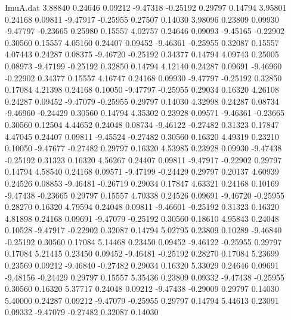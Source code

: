 \begin{filecontents}{ImuA.dat}
   3.88840    0.24646    0.09212   -9.47318   -0.25192    0.29797    0.14794
   3.95801    0.24168    0.09811   -9.47917   -0.25955    0.27507    0.14030
   3.98096    0.23809    0.09930   -9.47797   -0.23665    0.25980    0.15557
   4.02757    0.24646    0.09093   -9.45165   -0.22902    0.30560    0.15557
   4.05160    0.24407    0.09452   -9.46361   -0.25955    0.32087    0.15557
   4.07443    0.24287    0.08375   -9.46720   -0.25192    0.34377    0.14794
   4.09743    0.25005    0.08973   -9.47199   -0.25192    0.32850    0.14794
   4.12140    0.24287    0.09691   -9.46960   -0.22902    0.34377    0.15557
   4.16747    0.24168    0.09930   -9.47797   -0.25192    0.32850    0.17084
   4.21398    0.24168    0.10050   -9.47797   -0.25955    0.29034    0.16320
   4.26108    0.24287    0.09452   -9.47079   -0.25955    0.29797    0.14030
   4.32998    0.24287    0.08734   -9.46960   -0.24429    0.30560    0.14794
   4.35302    0.23928    0.09571   -9.46361   -0.23665    0.30560    0.12504
   4.44652    0.24048    0.08734   -9.46122   -0.27482    0.31323    0.17847
   4.47045    0.24407    0.09811   -9.45524   -0.27482    0.30560    0.16320
   4.49319    0.23210    0.10050   -9.47677   -0.27482    0.29797    0.16320
   4.53985    0.23928    0.09930   -9.47438   -0.25192    0.31323    0.16320
   4.56267    0.24407    0.09811   -9.47917   -0.22902    0.29797    0.14794
   4.58540    0.24168    0.09571   -9.47199   -0.24429    0.29797    0.20137
   4.60939    0.24526    0.08853   -9.46481   -0.26719    0.29034    0.17847
   4.63321    0.24168    0.10169   -9.47438   -0.23665    0.29797    0.15557
   4.70338    0.24526    0.09691   -9.46720   -0.25955    0.28270    0.16320
   4.79594    0.24048    0.09811   -9.46601   -0.25192    0.31323    0.16320
   4.81898    0.24168    0.09691   -9.47079   -0.25192    0.30560    0.18610
   4.95843    0.24048    0.10528   -9.47917   -0.22902    0.32087    0.14794
   5.02795    0.23809    0.10289   -9.46840   -0.25192    0.30560    0.17084
   5.14468    0.23450    0.09452   -9.46122   -0.25955    0.29797    0.17084
   5.21415    0.23450    0.09452   -9.46481   -0.25192    0.28270    0.17084
   5.23699    0.23569    0.09212   -9.46840   -0.27482    0.29034    0.16320
   5.33029    0.24646    0.09691   -9.48156   -0.24429    0.29797    0.15557
   5.35436    0.23809    0.09332   -9.47438   -0.25955    0.30560    0.16320
   5.37717    0.24048    0.09212   -9.47438   -0.29009    0.29797    0.14030
   5.40000    0.24287    0.09212   -9.47079   -0.25955    0.29797    0.14794
   5.44613    0.23091    0.09332   -9.47079   -0.27482    0.32087    0.14030

\end{filecontents}

